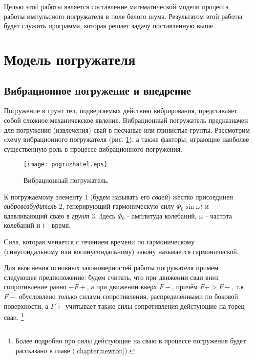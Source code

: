 Целью этой работы является составление математической модели процесса работы импульсного погружателя в поле белого шума.
Результатом этой работы будет служить программа, которая решает задачу поставленную выше.

\clearpage

\section{Модель погружателя}

\subsection{Вибрационное погружение и внедрение}

Погружение в грунт тел, подвергаемых действию вибрирования, представляет собой сложное механичекское явление. Вибрационный
погружатель предназначен для погружения (извлечения) свай в песчаные или глинистые грунты. Рассмотрим cхему вибрационного
погружателя (рис. \ref{fig:vp}), а также факторы, играющие наиболее существенную роль в процессе вибрационного погружения.

\begin{figure}[h]
    \centering
    \texttt{[image: pogruzhatel.eps]}
    \caption{Вибрационный погружатель.}
    \label{fig:vp}
\end{figure}

\noindent К погружаемому элементу 1 (будем называть его \textit{сваей}) жестко присоединен \textit{вибровозбудитель} 2,
генерирующий гармоническую силу $\Phi_0 \sin \omega t$ и вдавливающий сваю в \textit{грунт} 3. Здесь $\Phi_0$ - амплитуда
колебаний, $\omega$ - частота колебаний и $t$ - время.

\begin{definition}
    Сила, которая меняется с течением времени по гармоническому (синусоидальному или косинусоидальному)
    закону называется гармонической.
\end{definition}

Для выяснения основных закономерностей работы погружателя примем следующее предположение: будем считать, что
при движении сваи вниз сопротивление равно $-F+$, а при движении вверх $F-$, причём $F+ > F-$, т.к. $F-$ обусловлено только
силами сопротивления, распределёнными по боковой поверхности, а $F+$ учитывает также силы сопротивления дейстующие на
торец сваи. \footnote{Более подробно про силы дейстующие на сваю в процессе погружения будет рассказано
в главе (\ref{chapter:newton}).}

